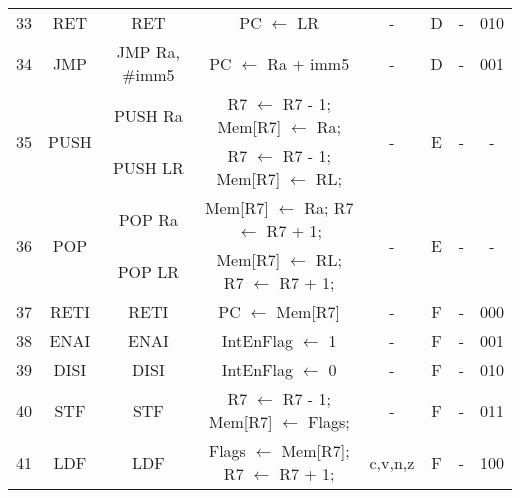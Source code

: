 \begin{minipage}[c]{\linewidth}
{\begin{tabular}{r|c|c|c|c|c|c|c|}
	33& RET   & RET                 & PC $\leftarrow$ LR            & -       & D & -     & 010 \\
	34& JMP   & JMP Ra, \#imm5      & PC $\leftarrow$ Ra + imm5     & -       & D & -     & 001 \\
	\multirow{2}{*}{35}& \multirow{2}{*}{PUSH}  & PUSH Ra             & R7 $\leftarrow$ R7 - 1; Mem[R7] $\leftarrow$ Ra; & \multirow{2}{*}{-} & \multirow{2}{*}{E} & \multirow{2}{*}{-} & \multirow{2}{*}{-} \\
	  &       & PUSH LR             & R7 $\leftarrow$ R7 - 1; Mem[R7] $\leftarrow$ RL; &   &   &   &   \\
	\multirow{2}{*}{36}& \multirow{2}{*}{POP}   & POP Ra              & Mem[R7] $\leftarrow$ Ra; R7 $\leftarrow$ R7 + 1; & \multirow{2}{*}{-} & \multirow{2}{*}{E} & \multirow{2}{*}{-} & \multirow{2}{*}{-} \\
	  &       & POP LR              & Mem[R7] $\leftarrow$ RL; R7 $\leftarrow$ R7 + 1; &   &   &   &   \\
	37& RETI  & RETI                & PC $\leftarrow$ Mem[R7]       & -       & F & -     & 000 \\
	38& ENAI  & ENAI                & IntEnFlag $\leftarrow$ 1      & -       & F & -     & 001 \\
	39& DISI  & DISI                & IntEnFlag $\leftarrow$ 0      & -       & F & -     & 010 \\
	40& STF   & STF                 & R7 $\leftarrow$ R7 - 1; Mem[R7] $\leftarrow$ Flags; & - & F & - & 011 \\
	41& LDF   & LDF                 & Flags $\leftarrow$ Mem[R7]; R7 $\leftarrow$ R7 + 1; & c,v,n,z & F & - & 100 \\
	\cline{2-8}
\end{tabular}
}
\end{minipage}
\restoregeometry